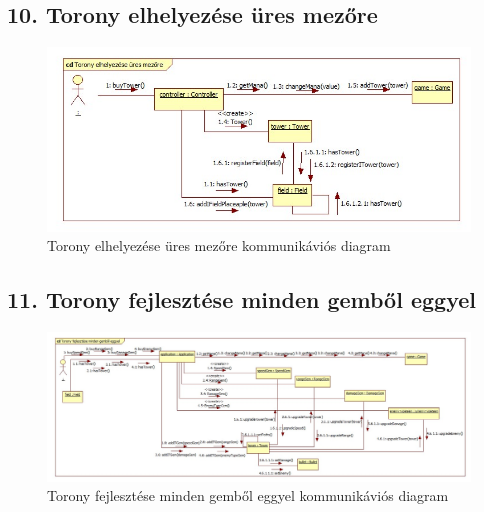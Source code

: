 \subsection{10. Torony elhelyezése üres mezőre}
\begin{figure}[H]
\begin{center}
\includegraphics[width=17cm]{chapters/chapter05/images/cd_Torony_elhelyezese_ures_mezore.jpg}
\caption{Torony elhelyezése üres mezőre kommunikáviós diagram}
\label{fig:cd_Torony_elhelyezese_ures_mezore}
\end{center}
\end{figure}

\subsection{11. Torony fejlesztése minden gemből eggyel}
\begin{figure}[H]
\begin{center}
\includegraphics[width=13cm]{chapters/chapter05/images/cd_Torony_fejlesztese_minden_gembol_eggyel.jpg}
\caption{Torony fejlesztése minden gemből eggyel kommunikáviós diagram}
\label{fig:cd_Torony_fejlesztese_minden_gembol_eggyel}
\end{center}
\end{figure}

